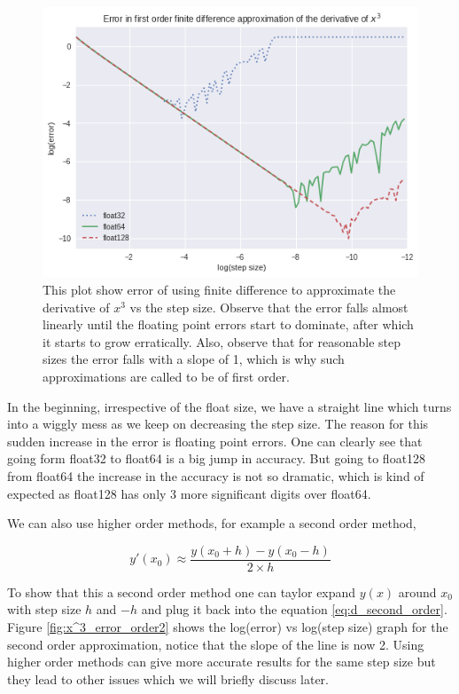 \begin{figure}[hbt!]
    \centering
    \includegraphics[width=\textwidth]{images/x^3_error_order1.png}
    \caption{This plot show error of using finite difference to approximate the derivative of $x^3$ vs the step size. Observe that the error falls almost linearly until the floating point errors start to dominate, after which it starts to grow erratically. Also, observe that for reasonable step sizes the error falls with a slope of 1, which is why such approximations are called to be of first order. }\label{fig:x^3_error_order1}
\end{figure}

In the beginning, irrespective of the float size, we have a straight line which turns into a wiggly mess as we keep on decreasing the step size. The reason for this sudden increase in the error is floating point errors. One can clearly see that going form float32 to float64 is a big jump in accuracy. But going to float128 from float64 the increase in the accuracy is not so dramatic, which is kind of expected as float128 has only 3 more significant digits over float64.

We can also use higher order methods, for example a second order method,

\begin{equation}
    y'(x_0)  \approx \frac{y(x_0 + h) - y(x_0 - h)}{2 \times h}
    \label{eq:d_second_order}
\end{equation}

To show that this a second order method one can taylor expand $y(x)$ around $x_0$ with step size $h$ and $-h$ and plug it back into the equation \ref{eq:d_second_order}. Figure \ref{fig:x^3_error_order2} shows the log(error) vs log(step size) graph for the second order approximation, notice that the slope of the line is now 2. Using higher order methods can give more accurate results for the same step size but they lead to other issues which we will briefly discuss later.

